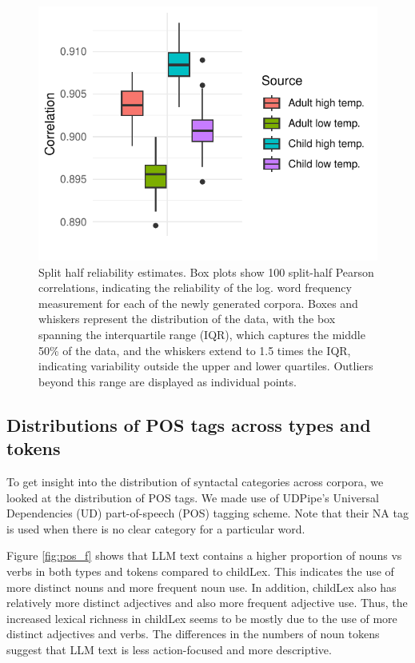 \documentclass[doc, a4paper, anonymous]{apa7}
\begin{document}
\begin{figure}[!htbp]

    \includegraphics[width = 0.8\paperwidth]{figures/boxplot-split-pearson.pdf}
    \caption{Split half reliability estimates. Box plots show 100 split-half Pearson correlations, indicating the reliability of the log. word frequency measurement for each of the newly generated corpora. Boxes and whiskers represent the distribution of the data, with the box spanning the interquartile range (IQR), which captures the middle 50\% of the data, and the whiskers extend to 1.5 times the IQR, indicating variability outside the upper and lower quartiles. Outliers beyond this range are displayed as individual points.}
    \label{fig:reliablity}
\end{figure}

\clearpage


\subsection{Distributions of POS tags across types and tokens}

To get insight into the distribution of syntactal categories across corpora, we looked at the distribution of POS tags. We made use of UDPipe's Universal Dependencies (UD) part-of-speech (POS) tagging scheme. Note that their NA tag is used when there is no clear category for a particular word. 

Figure \ref{fig:pos_f} shows that LLM text contains a higher proportion of nouns vs verbs in both types and tokens compared to childLex. This indicates the use of more distinct nouns and more frequent noun use. In addition, childLex also has relatively more distinct adjectives and also more frequent adjective use. Thus, the increased lexical richness in childLex seems to be mostly due to the use of more distinct adjectives and verbs. The differences in the numbers of noun tokens suggest that LLM text is less action-focused and more descriptive.
\end{document}
